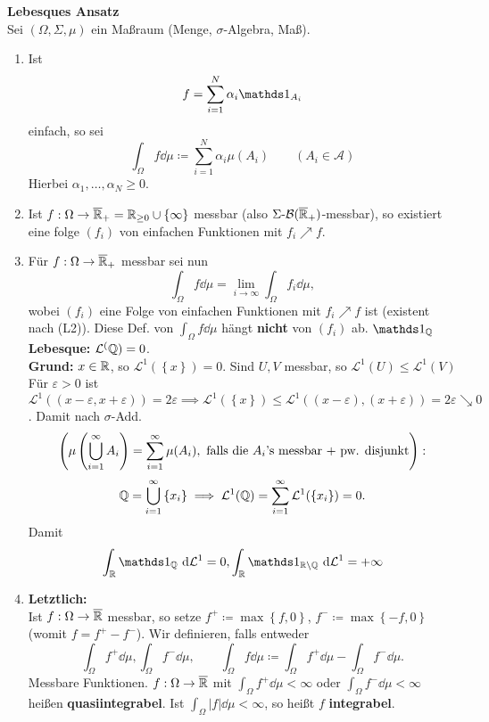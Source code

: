 \textbf{Lebesques Ansatz}\\
Sei $ (\Omega, \Sigma, \mu) $ ein Maßraum (Menge, $ \sigma $-Algebra, Maß).
\begin{enumerate}[label=(L\arabic*)]
	\item Ist
		\[
			f = \sum_{i=1}^{N} \alpha_i \I_{A_i} 
		\]
		einfach, so sei
		\[
			\int _{\Omega} f \dd \mu \coloneqq \sum_{i=1}^{N} \alpha_i \mu (A_i) \qquad (A_i \in \mathcal{A} )
		\]
		Hierbei $ \alpha_1, \dotsc, \alpha_N \geq 0 $.
	\item Ist $ f : \Omega \to \overline{\mathbb{R} } _+ = \mathbb{R} _{\geq 0} \cup \left\{ \infty \right\}  $ messbar (also $ \Sigma \text{-}  \mathcal{B} (\overline{\mathbb{R} } _+) $-messbar), so existiert eine folge $ (f_i) $ von einfachen Funktionen mit $ f_i \nearrow f $.
	\item Für $ f : \Omega \to \overline{\mathbb{R} } _+ $ messbar sei nun
		\[
			\int _\Omega f \dd \mu = \lim_{i \to \infty} \int _\Omega f_i \dd \mu,
		\]
		wobei $ (f_i) $ eine Folge von einfachen Funktionen mit $ f_i \nearrow f $ ist (existent nach (L2)).
		Diese Def. von $ \int _\Omega f \dd \mu $ hängt \textbf{nicht} von $ (f_i) $ ab.
		$ \I_\Q  $\\
		\textbf{Lebesque:} $ \mathcal{L} ^(\mathbb{Q} ) = 0 $.\\
		\textbf{Grund:} $ x \in \mathbb{R}  $, so $ \mathcal{L} ^1\left( \left\{ x \right\}  \right) = 0 $.
		Sind $ U, V $ messbar, so $ \mathcal{L} ^1(U) \leq \mathcal{L} ^1(V) $ 
		Für $ \varepsilon > 0 $ ist $ \mathcal{L} ^1((x - \varepsilon, x + \varepsilon )) = 2 \varepsilon  \implies \mathcal{L} ^1(\left\{ x \right\} ) \leq \mathcal{L} ^1 ((x - \varepsilon ), (x + \varepsilon )) = 2 \varepsilon \searrow 0 $.
		Damit nach $ \sigma $-Add. 
		\[
			\left( \mu \left( \bigcup_{i = 1} ^\infty A_i \right) = \sum_{i=1}^{\infty} \mu (A_i), \text{ falls  die $ A_i $'s messbar + pw. disjunkt}  \right) :
		\]
		\[
			\mathbb{Q}  = \bigcup_{i = 1} ^\infty \left\{ x_i \right\} \implies \mathcal{L} ^1(\mathbb{Q} ) = \sum_{i=1}^{\infty} \mathcal{L} ^1 ( \left\{ x_i \right\} ) = 0.
		\]
		Damit
		\[
			\int_{\R }^{} \I_{\Q } \dd \mathcal{L} ^1 = 0, \int_{\R }^{} \I_{\R  \setminus \Q } \dd \mathcal{L} ^1 = +\infty
		\]
	\item \textbf{Letztlich:}\\
		Ist $ f : \Omega \to \overline{\mathbb{R} }  $ messbar, so setze $ f^+ \coloneqq \max \left\{ f, 0 \right\}  $, $ f^- \coloneqq \max \left\{ -f, 0 \right\}  $ (womit $ f = f^+ - f^- $).
		Wir definieren, falls entweder
		\[
			\int _\Omega f^+ \dd \mu, \int _\Omega f^{-} \dd \mu, \qquad \int _\Omega f \dd \mu \coloneqq \int _\Omega f^+ \dd \mu - \int_{\Omega}^{} f^- \dd \mu.
		\]
		Messbare Funktionen.
		$ f : \Omega \to \overline{\mathbb{R} }  $ mit $ \int _\Omega f^+ \dd \mu < \infty $ oder $ \int _\Omega f^- \dd \mu < \infty $ heißen \textbf{quasiintegrabel}.
		Ist $ \int_{\Omega}^{} \left| f \right| \dd \mu < \infty $, so heißt $ f $ \textbf{integrabel}.
\end{enumerate}

